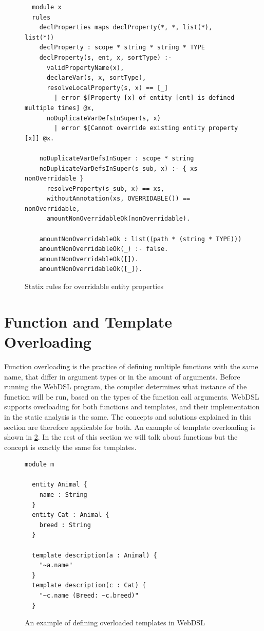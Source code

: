       \begin{figure}
        \begin{verbatim}
  module x
  rules
    declProperties maps declProperty(*, *, list(*), list(*))
    declProperty : scope * string * string * TYPE
    declProperty(s, ent, x, sortType) :-
      validPropertyName(x),
      declareVar(s, x, sortType),
      resolveLocalProperty(s, x) == [_]
        | error $[Property [x] of entity [ent] is defined multiple times] @x,
      noDuplicateVarDefsInSuper(s, x)
        | error $[Cannot override existing entity property [x]] @x.

    noDuplicateVarDefsInSuper : scope * string
    noDuplicateVarDefsInSuper(s_sub, x) :- { xs nonOverridable }
      resolveProperty(s_sub, x) == xs,
      withoutAnnotation(xs, OVERRIDABLE()) == nonOverridable,
      amountNonOverridableOk(nonOverridable).

    amountNonOverridableOk : list((path * (string * TYPE)))
    amountNonOverridableOk(_) :- false.
    amountNonOverridableOk([]).
    amountNonOverridableOk([_]).
        \end{verbatim}
        \caption{\label{fig:overridable-properties-statix}Statix rules for overridable entity properties}
      \end{figure}

  \section{\label{sec:function-template-overloading}Function and Template Overloading}

    Function overloading is the practice of defining multiple functions with the same name, that differ in argument types or in the amount of arguments. Before running the WebDSL program, the compiler determines what instance of the function will be run, based on the types of the function call arguments. WebDSL supports overloading for both functions and templates, and their implementation in the static analysis is the same. The concepts and solutions explained in this section are therefore applicable for both. An example of template overloading is shown in \cref{fig:template-overloading-example}. In the rest of this section we will talk about functions but the concept is exactly the same for templates.

    \begin{figure}
      \begin{verbatim}
module m

  entity Animal {
    name : String
  }
  entity Cat : Animal {
    breed : String
  }

  template description(a : Animal) {
    "~a.name"
  }
  template description(c : Cat) {
    "~c.name (Breed: ~c.breed)"
  }
      \end{verbatim}
      \caption{\label{fig:template-overloading-example}An example of defining overloaded templates in WebDSL}
    \end{figure}

